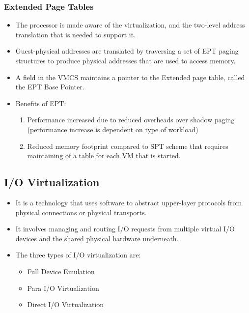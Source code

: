 \documentclass{article}
\begin{document}
\subsubsection{Extended Page Tables}
\begin{itemize}
    \item The processor is made aware of the virtualization, and the two-level address translation that is needed to support it. 
    
    \item Guest-physical addresses are translated by traversing a set of EPT paging structures to produce physical addresses that are used to access memory.
    
    \item A field in the VMCS maintains a pointer to the Extended page table, called the EPT Base Pointer.
    
    \item Benefits of EPT:
    \begin{enumerate}
        \item Performance increased due to reduced overheads over shadow paging (performance increase is dependent on type of workload)
        
        \item Reduced memory footprint compared to SPT scheme that requires maintaining of a table for each VM that is started. 
    \end{enumerate}
\end{itemize}

\subsection{I/O Virtualization}
\begin{itemize}
    \item It is a technology that uses software to abstract upper-layer protocols from physical connections or physical transports.
    
    \item It involves managing and routing I/O requests from multiple virtual I/O devices and the shared physical hardware underneath.
    
    \item The three types of I/O virtualization are:
    \begin{itemize}
        \item Full Device Emulation
        
        \item Para I/O Virtualization
        
        \item Direct I/O Virtualization
    \end{itemize}
\end{itemize}
\end{document}
